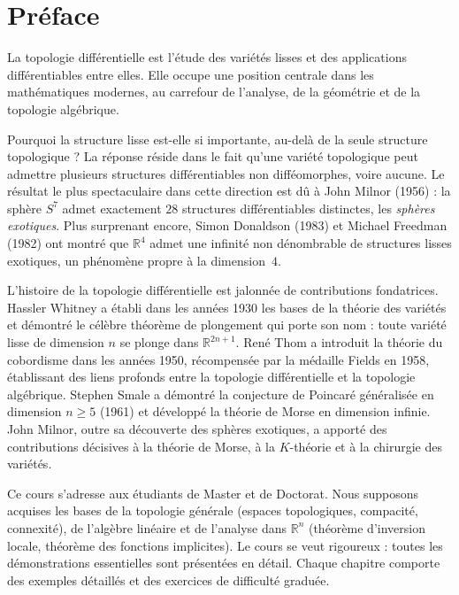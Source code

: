 \documentclass[12pt,a4paper,openany]{book}
\theoremstyle{definition}
\theoremstyle{plain}
\theoremstyle{remark}
\newcommand{\R}{\mathbb{R}}
\begin{document}
\chapter*{Préface}

La topologie différentielle est l'étude des variétés lisses et des applications
différentiables entre elles. Elle occupe une position centrale dans les
mathématiques modernes, au carrefour de l'analyse, de la géométrie et de la
topologie algébrique.

\medskip

Pourquoi la structure lisse est-elle si importante, au-delà de la seule structure
topologique ? La réponse réside dans le fait qu'une variété topologique peut
admettre plusieurs structures différentiables non difféomorphes, voire aucune.
Le résultat le plus spectaculaire dans cette direction est dû à John Milnor
(1956) : la sphère $S^7$ admet exactement $28$ structures différentiables
distinctes, les \emph{sphères exotiques}. Plus
surprenant encore, Simon Donaldson (1983) et Michael Freedman (1982) ont montré
que $\R^4$ admet une infinité non dénombrable de structures lisses exotiques,
un phénomène propre à la dimension~$4$.

\medskip

L'histoire de la topologie différentielle est jalonnée de contributions
fondatrices. Hassler Whitney a établi dans les années
1930 les bases de la théorie des variétés et démontré le célèbre théorème de
plongement qui porte son nom : toute variété lisse de dimension $n$ se plonge
dans $\R^{2n+1}$. René Thom a introduit la théorie du
cobordisme dans les années 1950, récompensée par la médaille Fields en 1958,
établissant des liens profonds entre la topologie différentielle et la topologie
algébrique. Stephen Smale a démontré la conjecture de
Poincaré généralisée en dimension $n \geq 5$ (1961) et développé la théorie de
Morse en dimension infinie. John Milnor, outre sa
découverte des sphères exotiques, a apporté des contributions décisives à la
théorie de Morse, à la $K$-théorie et à la chirurgie des variétés.

\medskip

Ce cours s'adresse aux étudiants de Master et de Doctorat. Nous supposons
acquises les bases de la topologie générale (espaces topologiques, compacité,
connexité), de l'algèbre linéaire et de l'analyse dans $\R^n$ (théorème
d'inversion locale, théorème des fonctions implicites). Le cours se veut
rigoureux : toutes les démonstrations essentielles sont présentées en détail.
Chaque chapitre comporte des exemples détaillés et des exercices de difficulté
graduée.
\end{document}
